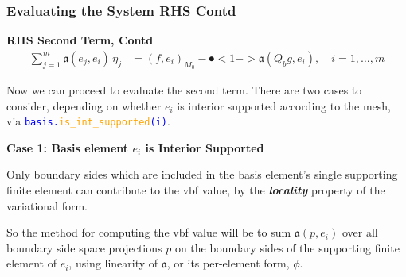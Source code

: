 \documentclass[compress]{beamer}
\begin{document}
\begin{frame}
  \frametitle{Evaluating the System RHS Contd}
  \vspace{-.15cm}
  \textbf{RHS Second Term, Contd}
  \vspace{-.20cm}
  \begin{align*}
    \sum_{j=1}^m{\mathfrak{a}(e_j, e_i) \,\eta_j} &= (f, e_i)_{M_0} - \spot<1->{\mathfrak{a}(Q_b g, e_i)}, \quad i=1,\dots,m
  \end{align*}
  
  \uncover<+-> {
  Now we can proceed to evaluate the second term.
  There are two cases to consider, depending on whether $e_i$ is interior supported according to the mesh, via
  {\small \texttt{\textcolor{blue}{basis.\textcolor{orange}{is\_int\_supported}(i)}}}.
  
  \uncover<+-> {
  \vspace{.1cm}
  \textbf{Case 1: Basis element $e_i$ is Interior Supported}
  \vspace{.1cm}
  
  Only boundary sides which are included in the basis element's single supporting finite element can contribute to the vbf value, by the 
  \emph{\textbf{locality}} property of the variational form.

  \vspace{.1cm}
  \uncover<+-> {
  So the method for computing the vbf value will be to sum $\mathfrak{a}(p, e_i)$ over all boundary side space projections
  $p$ on the boundary sides of the supporting finite element of $e_i$, using linearity of $\mathfrak{a}$, or its per-element
  form, $\phi$.
  }}}
\end{frame}
\end{document}
